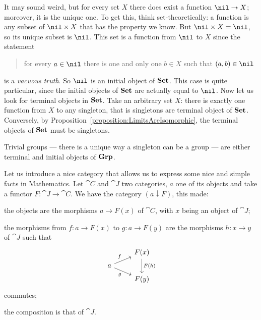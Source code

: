 \begin{example}
It may sound weird, but for every set \(X\) there does exist a function \(\nil \to X\); moreover, it is the unique one. To get this, think set-theoretically: a function is any subset of \(\nil \times X\) that has the property we know. But \(\nil \times X = \nil\), so its unique subset is \(\nil\). This set is a function from \(\nil\) to \(X\) since the statement
\begin{quotation}
for every \(a \in \nil\) there is one and only one \(b \in X\) such that \((a, b) \in \nil\)
\end{quotation}
is a {\em vacuous truth}.
So \(\nil\) is an initial object of \(\mathbf{Set}\). This case is quite particular, since the initial objects of \(\mathbf{Set}\) are actually equal to \(\nil\). \newline
Now let us look for terminal objects in \(\mathbf{Set}\). Take an arbitrary set \(X\): there is exactly one function from \(X\) to any singleton, that is singletons are terminal object of \(\mathbf{Set}\). Conversely, by Proposition~\ref{proposition:LimitsAreIsomorphic}, the terminal objects of \(\mathbf{Set}\) must be singletons.
\end{example}

\begin{exercise}
Trivial groups --- there is a unique way a singleton can be a group --- are either terminal and initial objects of \(\mathbf{Grp}\).
\end{exercise}

\begin{construction}
Let us introduce a nice category that allows us to express some nice and simple facts in Mathematics. Let \(\cat C\) and \(\cat J\) two categories, \(a\) one of its objects and take a functor \(F : \cat J \to \cat C\). We have the category \((a \downarrow F)\), this made:
\begin{tcbitem}
\item the objects are the morphisms \(a \to F(x)\) of \(\cat C\), with \(x\) being an object of \(\cat J\);
\item the morphisms from \(f : a \to F(x)\) to \(g : a \to F(y)\) are the morphisms \(h : x \to y\) of \(\cat J\) such that
\[\begin{tikzcd}[row sep=tiny]
 & F(x) \ar["{F(h)}", dd] \\
a \ar["f", ur] \ar["g", dr, swap] \\
 & F(y)
\end{tikzcd}\]
commutes;
\item the composition is that of \(\cat J\). 
\end{tcbitem}
\end{construction}

